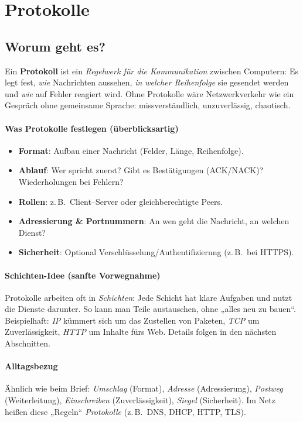 \documentclass[../skript/main.tex]{subfiles}
\begin{document}
\section{Protokolle}\label{sec:protokolle}
\subsection*{Worum geht es?}
Ein \textbf{Protokoll} ist ein \emph{Regelwerk für die Kommunikation} zwischen Computern: Es legt fest,
\emph{wie} Nachrichten aussehen, \emph{in welcher Reihenfolge} sie gesendet werden und \emph{wie} auf Fehler
reagiert wird. Ohne Protokolle wäre Netzwerkverkehr wie ein Gespräch ohne gemeinsame Sprache:
missverständlich, unzuverlässig, chaotisch.

\paragraph{Was Protokolle festlegen (überblicksartig)}
\begin{itemize}
	\item \textbf{Format}: Aufbau einer Nachricht (Felder, Länge, Reihenfolge).
	\item \textbf{Ablauf}: Wer spricht zuerst? Gibt es Bestätigungen (ACK/NACK)? Wiederholungen bei Fehlern?
	\item \textbf{Rollen}: z.\,B.\ Client–Server oder gleichberechtigte Peers.
	\item \textbf{Adressierung \& Portnummern}: An wen geht die Nachricht, an welchen Dienst?
	\item \textbf{Sicherheit}: Optional Verschlüsselung/Authentifizierung (z.\,B.\ bei HTTPS).
\end{itemize}

\paragraph{Schichten-Idee (sanfte Vorwegnahme)}
Protokolle arbeiten oft in \emph{Schichten}: Jede Schicht hat klare Aufgaben und nutzt die Dienste
darunter. So kann man Teile austauschen, ohne „alles neu zu bauen“. Beispielhaft:
\emph{IP} kümmert sich um das Zustellen von Paketen, \emph{TCP} um Zuverlässigkeit,
\emph{HTTP} um Inhalte fürs Web. Details folgen in den nächsten Abschnitten.

\paragraph{Alltagsbezug}
Ähnlich wie beim Brief: \emph{Umschlag} (Format), \emph{Adresse} (Adressierung),
\emph{Postweg} (Weiterleitung), \emph{Einschreiben} (Zuverlässigkeit), \emph{Siegel} (Sicherheit).
Im Netz heißen diese „Regeln“ \emph{Protokolle} (z.\,B.\ DNS, DHCP, HTTP, TLS).


	
\end{document}

